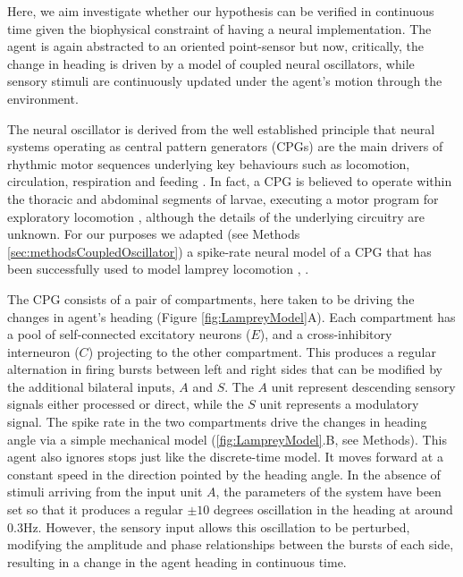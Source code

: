 \documentclass[11pt,a4paper]{article}
\begin{document}
Here, we aim investigate whether our hypothesis can be verified in continuous time given the biophysical constraint of having a neural implementation.
The agent is again abstracted to an oriented point-sensor but now, critically, the change in heading is driven by a model of coupled neural oscillators, while sensory stimuli are continuously updated under the agent's motion through the environment.



 The neural oscillator is derived from the well established principle that neural systems operating as central pattern generators (CPGs) are the main drivers of rhythmic motor sequences underlying key behaviours such as locomotion, circulation, respiration and feeding \citep{delcomyn1980neural}.
In fact, a CPG is believed to operate  within the thoracic and abdominal segments of larvae, executing a motor program for exploratory locomotion \citep{hughes2007sensory,berni2012autonomous,lemon2015whole}, although the details of the underlying circuitry are unknown.
For our purposes we adapted (see Methods \ref{sec:methodsCoupledOscillator}) a spike-rate neural model of a CPG that has been successfully used to model lamprey locomotion \citep{cohen1992modelling,lansner1997realistic}, \cite[see][]{marder1996principles}.

The CPG consists of a pair of compartments, here taken to be driving the changes in agent's heading (Figure \ref{fig:LampreyModel}A). 
Each compartment has a pool of self-connected excitatory neurons ($E$), and a cross-inhibitory interneuron ($C$) projecting to the other compartment.
  This produces a regular alternation in firing bursts between left and right sides that can be modified by the additional bilateral inputs, $A$ and $S$. The $A$ unit represent descending sensory signals either processed or direct, while the $S$ unit represents a modulatory signal.
 The spike rate in the two compartments drive the changes in heading angle via a simple mechanical model (\ref{fig:LampreyModel}.B, see Methods).
  This agent also ignores stops just like the discrete-time model.
   It moves forward at a constant speed in the direction pointed by the heading angle.
    In the absence of stimuli arriving from the input unit $A$, the parameters of the system have been set so that it produces a regular $\pm 10$ degrees oscillation in the heading at around 0.3Hz.
    However, the sensory input allows this oscillation to be perturbed, modifying  the amplitude and phase relationships between the bursts of each side, resulting in a change in the agent heading in continuous time.
\end{document}
